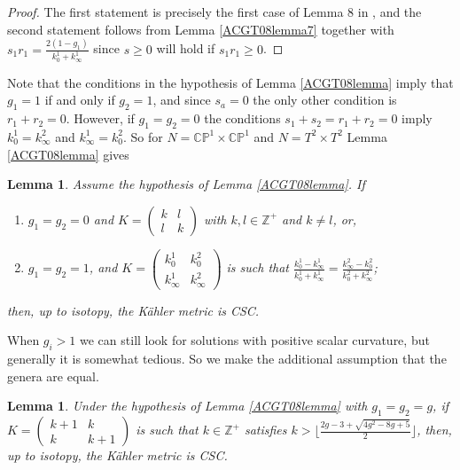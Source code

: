 \documentclass[12pt]{amsart}
\newtheorem{lemma}[theorem]{Lemma}
\def\bbc{{\mathbb C}}
\def\bbp{{\mathbb P}}
\def\bbz{{\mathbb Z}}
\begin{document}
\begin{proof}
The first statement is precisely the first case of Lemma 8 in \cite{ACGT08}, and the second statement follows from Lemma \ref{ACGT08lemma7} together with $s_1r_1=\frac{2(1-g_1)}{k^1_0+k^1_\infty}$ since $s\geq 0$ will hold if $s_1r_1\geq 0$.
\end{proof}


Note that the conditions in the hypothesis of Lemma \ref{ACGT08lemma} imply that $g_1=1$ if and only if $g_2=1$, and since $s_a=0$ the only other condition is $r_1+r_2=0$. However, if $g_1=g_2=0$ the conditions $s_1+s_2=r_1+r_2=0 $ imply $k^1_0=k^2_\infty$ and $k^1_\infty=k^2_0$. So for $N=\bbc\bbp^1\times \bbc\bbp^1$ and $N=T^2\times T^2$ Lemma \ref{ACGT08lemma} gives

\begin{lemma}\label{g1g0lem}
Assume the hypothesis of Lemma \ref{ACGT08lemma}. If
\begin{enumerate}
\item $g_1=g_2=0$ and $K= \begin{pmatrix}
    k & l \\
l & k
\end{pmatrix}$
with $k,l\in \bbz^+$ and $k\neq l$, or,
\item  $g_1=g_2=1$,
and $K= \begin{pmatrix}
     k^1_0 & k^2_0 \\
k^1_{\infty} & k^2_{\infty}
\end{pmatrix}$ is such that 
$\frac{k^1_0-k^1_\infty}{k^1_0+k^1_\infty}=\frac{k^2_\infty-k^2_0}{k^2_0+k^2_\infty}$;
\end{enumerate}
then, up to isotopy, the K\"ahler metric is CSC.
\end{lemma}

When $g_i>1$ we can still look for solutions with positive scalar curvature, but generally it is somewhat tedious. So we make the additional assumption that the genera are equal. 


\begin{lemma}\label{ACGT08lemma8c}
Under the hypothesis of Lemma \ref{ACGT08lemma} with $g_1=g_2=g$,
if $K= \begin{pmatrix}
     k+1 & k \\
k & k+1
\end{pmatrix}$ is such that $k\in \bbz^+$ satisfies
$k> \lfloor\frac{2 g-3 +\sqrt{4 g^2-8 g+5}}{2} \rfloor$,
then, up to isotopy, the K\"ahler metric is CSC.
\end{lemma}
\end{document}
